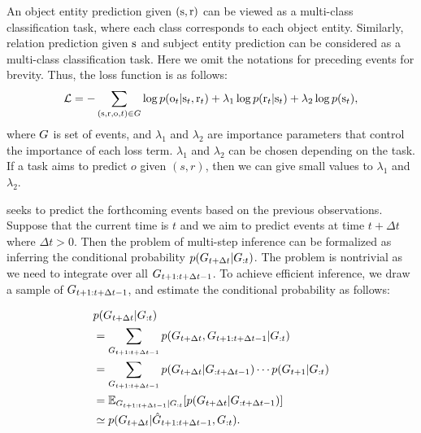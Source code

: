 An object entity prediction given $(\mathrm{s},\mathrm{r})$ can be viewed as a multi-class classification task, where each class corresponds to each object entity.
Similarly, relation prediction given $\mathrm{s}$ and subject entity prediction can be considered as a multi-class classification task. 
Here we omit the notations for preceding events for brevity.
Thus, the loss function is as follows:
\begin{equation}
    \small \mathcal{L} = -\sum_{(\mathrm{s},\mathrm{r},\mathrm{o},t) \in G}  \log p(\mathrm{o}_t|\mathrm{s}_t,\mathrm{r}_t) +\lambda_1 \log p(\mathrm{r}_t|\mathrm{s}_t) + \lambda_2 \log p(\mathrm{s}_t),
    \label{loss}
\end{equation}
where $G$ is set of events, and $\lambda_1$ and $\lambda_2$ are importance parameters that control the importance of each loss term. $\lambda_1$ and $\lambda_2$ can be chosen depending on the task. 
If a task aims to predict  $o$ given $(s,r)$, then we can give small values to $\lambda_1$ and $\lambda_2$.






\method seeks to predict the forthcoming events based on the previous observations. 
Suppose that the current time is $t$ and we aim to predict events at time $t + \Delta t$ where $\Delta t>0$. 
Then the problem of multi-step inference can be formalized as inferring the conditional probability {\small $p (G_{t+\Delta t}|G_{:t})$}. 
The problem is nontrivial as we need to integrate over all $G_{t+1:t+\Delta t-1}$. To achieve efficient inference, we draw a sample of $G_{t+1:t+\Delta t-1}$, and estimate the conditional probability as follows:

\small
\begin{align*}
	&p (G_{t+\Delta t}|G_{:t})\nonumber\\
	&= \sum_{G_{t+1:t+\Delta t-1}} p (G_{t+\Delta t}, G_{t+1:t+\Delta t-1}|G_{:t})\\ 
	&= \sum_{G_{t+1:t+\Delta t-1}} p(G_{t+\Delta t}|G_{:t+\Delta t-1})  \cdots  p(G_{t+1}|G_{:t})\\ 
	&= \mathbb{E}_{G_{t+1:t+\Delta t-1}|G_{:t}} [p(G_{t+\Delta t}|G_{:t+\Delta t-1})] \\
	&\simeq p(G_{t+\Delta t}|\hat{G}_{t+1:t+\Delta t-1},G_{:t}).
\end{align*}
\normalsize

